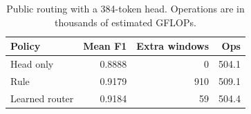 \begin{table}[t]
\centering
\small\setlength{\tabcolsep}{3pt}
\caption{Public routing with a 384-token head. Operations are in thousands of estimated GFLOPs.}
\label{tab:routing}
\begin{tabular}{lrrr}
\toprule
Policy & Mean F1 & Extra windows & Ops \\
\midrule
Head only & 0.8888 & 0 & 504.1 \\
Rule & 0.9179 & 910 & 509.1 \\
Learned router & 0.9184 & 59 & 504.4 \\
\bottomrule
\end{tabular}
\end{table}

